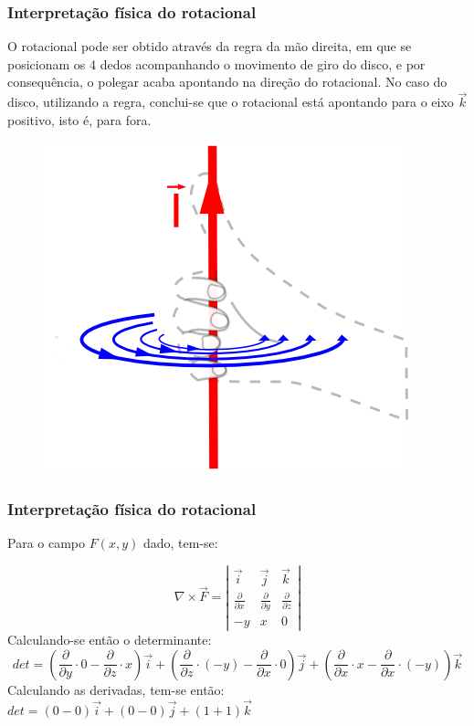 \begin{frame}
    \frametitle{Interpretação física do rotacional}
    \justifying
    O rotacional pode ser obtido através da regra da mão direita, em que se posicionam os 4 dedos acompanhando o movimento de giro do disco, e por consequência, o polegar acaba apontando na direção do rotacional. No caso do disco, utilizando a regra, conclui-se que o rotacional está apontando para o eixo $\vec{k}$ positivo, isto é, para fora.
    
    \begin{figure}[h]
        \centering
        \includegraphics[scale=0.3]{img/Right_hand_rule.png}
    \end{figure}
\end{frame}

\begin{frame}
    \frametitle{Interpretação física do rotacional}
    \justifying
    Para o campo $F(x,y)$ dado, tem-se:
    
    \begin{displaymath}
        \nabla \times \vec{F} = \left| \begin{array}{ccc}
            \vec{i}                     & \vec{j}                     & \vec{k}                     \\[3mm]
            \frac{\partial}{\partial x} & \frac{\partial}{\partial y} & \frac{\partial}{\partial z} \\[3mm]
            -y                          & x                           & 0
        \end{array}\right|
    \end{displaymath}
    Calculando-se então o determinante:
    \begin{equation*}
        det = \left(
        \frac{\partial}{\partial y} \cdot 0 - \frac{\partial}{\partial z} \cdot x
        \right)\vec{i} + \left(
        \frac{\partial}{\partial z} \cdot (-y) - \frac{\partial}{\partial x} \cdot 0
        \right)\vec{j} + \left(
        \frac{\partial}{\partial x} \cdot x - \frac{\partial}{\partial x} \cdot (-y)
        \right)\vec{k}
    \end{equation*}
    Calculando as derivadas, tem-se então:
    \\[3mm]
    $det = (0-0)\vec{i}+(0-0)\vec{j}+(1+1)\vec{k}$
\end{frame}